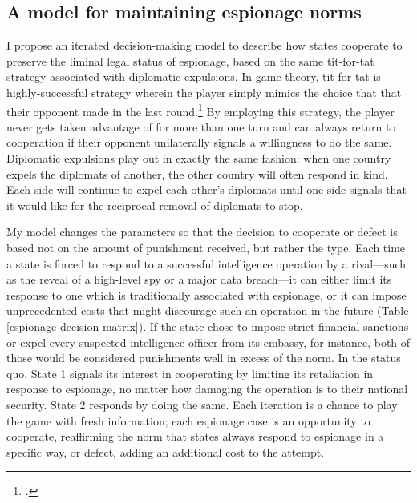\documentclass[12pt]{extarticle}
\begin{document}
\subsection{A model for maintaining espionage norms}
I propose an iterated decision-making model to describe how states cooperate to preserve the liminal legal status of espionage, based on the same tit-for-tat strategy associated with diplomatic expulsions. In game theory, tit-for-tat is highly-successful strategy wherein the player simply mimics the choice that that their opponent made in the last round.\footcite[8]{axelrod_effective_1980} By employing this strategy, the player never gets taken advantage of for more than one turn and can always return to cooperation if their opponent unilaterally signals a willingness to do the same. Diplomatic expulsions play out in exactly the same fashion: when one country expels the diplomats of another, the other country will often respond in kind. Each side will continue to expel each other's diplomats until one side signals that it would like for the reciprocal removal of diplomats to stop.


My model changes the parameters so that the decision to cooperate or defect is based not on the amount of punishment received, but rather the type. Each time a state is forced to respond to a successful intelligence operation by a rival---such as the reveal of a high-level spy or a major data breach---it can either limit its response to one which is traditionally associated with espionage, or it can impose unprecedented costs that might discourage such an operation in the future (Table \ref{espionage-decision-matrix}). If the state chose to impose strict financial sanctions or expel every suspected intelligence officer from its embassy, for instance, both of those would be considered punishments well in excess of the norm. In the status quo, State 1 signals its interest in cooperating by limiting its retaliation in response to espionage, no matter how damaging the operation is to their national security. State 2 responds by doing the same. Each iteration is a chance to play the game with fresh information; each espionage case is an opportunity to cooperate, reaffirming the norm that states always respond to espionage in a specific way, or defect, adding an additional cost to the attempt.
\end{document}
